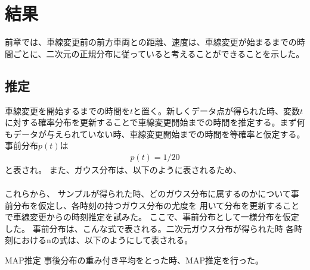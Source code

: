 \chapter{結果}
前章では、車線変更前の前方車両との距離、速度は、車線変更が始まるまでの時間ごとに、二次元の正規分布に従っていると考えることができることを示した。
\section{推定}
車線変更を開始するまでの時間を$t$と置く。新しくデータ点が得られた時、変数$t$に対する確率分布を更新することで車線変更開始までの時間を推定する。まず何もデータが与えられていない時、車線変更開始までの時間を等確率と仮定する。事前分布$p(t)$は
\begin{align}
p(t)=1/20
\end{align}
と表され。
また、ガウス分布は、以下のように表されるため、
\begin{align}

\end{align}

これらから、
サンプルが得られた時、どのガウス分布に属するのかについて事前分布を仮定し、各時刻の持つガウス分布の尤度を
用いて分布を更新することで車線変更からの時刻推定を試みた。
ここで、事前分布として一様分布を仮定した。
事前分布は、こんな式で表される。二次元ガウス分布が得られた時
各時刻におけるnの式は、以下のようにして表される。

MAP推定
事後分布の重み付き平均をとった時、MAP推定を行った。
